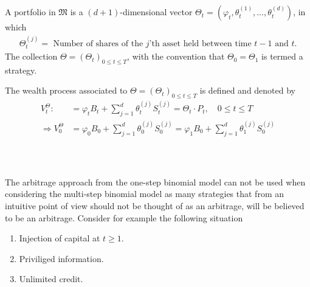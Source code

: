 \documentclass{beamer}
\numberwithin{equation}{section}
\begin{document}
\begin{frame}\frametitle{{\normalsize \secname} \\ {\large \subsecname}}
    \begin{definition}
        \begingroup
        \footnotesize
        A portfolio in $\mathfrak{M}$ is a $(d + 1)$-dimensional vector $\Theta_t = \left(\varphi_t, \theta_t^{(1)}, \ldots, \theta_t^{(d)}\right)$, in which
        \begin{align}
            \Theta_t^{(j)} = \text{ Number of shares of the $j$'th asset held between time $t - 1$ and $t$.}
        \end{align}
        The collection $\Theta = \left(\Theta_t\right)_{0 \leq t \leq T}$, with the convention that $\Theta_0 = \Theta_1$ is termed a strategy.
        
        The wealth process associated to $\Theta = \left(\Theta_t\right)_{0\leq t \leq T}$ is defined and denoted by
        \begin{align}
            V_t^\Theta :&= \varphi_tB_t + \sum_{j = 1}^d\theta_t^{(j)}S_t^{(j)} = \Theta_t \cdot P_t, \quad 0 \leq t \leq T \\
            \Rightarrow V_0^\Theta &= \varphi_0B_0 + \sum_{j = 1}^d\theta_0^{(j)}S_0^{(j)} = \varphi_1B_0 + \sum_{j = 1}^d\theta_1^{(j)}S_0^{(j)} 
        \end{align} 
        \endgroup
    \end{definition}
\end{frame}

\begin{frame}\frametitle{{\normalsize \secname} \\ {\large \subsecname}}
    The arbitrage approach from the one-step binomial model can not be used when considering the multi-step binomial model as many strategies that from an intuitive point of view should not be thought of as an arbitrage, will be believed to be an arbitrage.
    Consider for example the following situation
    \begin{enumerate}
        \item Injection of capital at $t \geq 1$.
        \item Priviliged information.
        \item Unlimited credit.
    \end{enumerate}
\end{frame}
\end{document}
